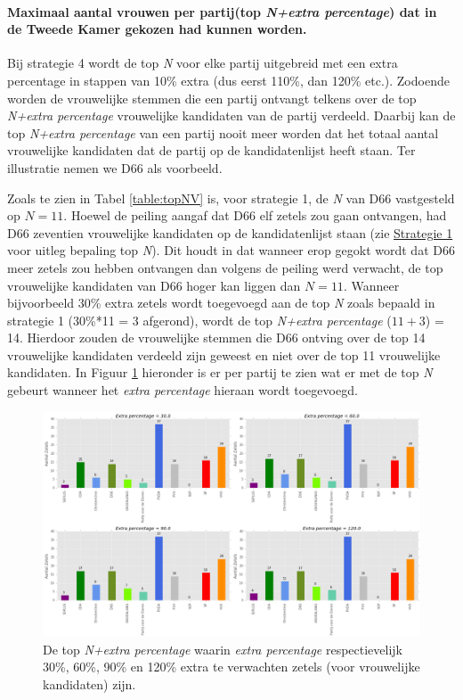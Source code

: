 \paragraph{Maximaal aantal vrouwen per partij(top \textit{N+extra percentage}) dat in de Tweede Kamer gekozen had kunnen worden.} 
Bij strategie 4 wordt de top \textit{N} voor elke partij uitgebreid met een extra percentage in stappen van 10\% extra (dus eerst 110\%, dan 120\% etc.). Zodoende worden de vrouwelijke stemmen die een partij ontvangt telkens over de top \textit{N+extra percentage} vrouwelijke kandidaten van de partij verdeeld. Daarbij kan de top \textit{N+extra percentage} van een partij nooit meer worden dat het totaal aantal vrouwelijke kandidaten dat de partij op de kandidatenlijst heeft staan. Ter illustratie nemen we D66 als voorbeeld. 

Zoals te zien in Tabel \ref{table:topNV} is, voor strategie 1, de \textit{N} van D66 vastgesteld op $N=11$. Hoewel de peiling aangaf dat D66 elf zetels zou gaan ontvangen, had D66 zeventien vrouwelijke kandidaten op de kandidatenlijst staan (zie \hyperref[S1V]{Strategie 1} voor uitleg bepaling top \textit{N}). Dit houdt in dat wanneer erop gegokt wordt dat D66 meer zetels zou hebben ontvangen dan volgens de peiling werd verwacht, de top vrouwelijke kandidaten van D66 hoger kan liggen dan $N=11$. Wanneer bijvoorbeeld 30\% extra zetels wordt toegevoegd aan de top \textit{N} zoals bepaald in strategie 1 (30\%*11 = 3 afgerond), wordt de top \textit{N+extra percentage} ($11+3$) = 14. Hierdoor zouden de vrouwelijke stemmen die D66 ontving over de top 14 vrouwelijke kandidaten verdeeld zijn geweest en niet over de top 11 vrouwelijke kandidaten. In Figuur \ref{fig:NexpV} hieronder is er per partij te zien wat er met de top \textit{N} gebeurt wanneer het \textit{extra percentage} hieraan wordt toegevoegd.      


\begin{figure}[H]

	\includegraphics[width=\linewidth]{topn_vermenigvuldiging2.png}

			\caption{De top \textit{N+extra percentage} waarin \textit{extra percentage} respectievelijk 30\%, 60\%, 90\% en 120\% extra te verwachten zetels (voor vrouwelijke kandidaten) zijn.}

\label{fig:NexpV}
\end{figure}

